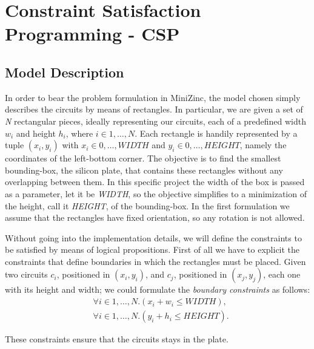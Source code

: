 \section{Constraint Satisfaction Programming - CSP}

\subsection{Model Description}

In order to bear the problem formulation in MiniZinc, the model chosen simply describes the circuits by means of rectangles. In particular, we are given a set of \emph{N} rectangular pieces, ideally representing our circuits, each of a predefined width $w_i$ and height $h_i$, where $i \in 1, \dots, N$. Each rectangle is handily represented by a tuple $(x_i, y_i)$ with $x_i \in 0,\dots, \textit{WIDTH}$ and $y_i \in 0,\dots, \textit{HEIGHT}$, namely the coordinates of the left-bottom corner. The objective is to find the smallest bounding-box, the silicon plate, that contains these rectangles without any overlapping between them. In this specific project the width of the box is passed as a parameter, let it be \textit{WIDTH}, so the objective simplifies to a minimization of the height, call it \textit{HEIGHT}, of the bounding-box. In the first formulation we assume that the rectangles have fixed orientation, so any rotation is not allowed. 

\bigskip
Without going into the implementation details, we will define the constraints to be satisfied by means of logical propositions. First of all we have to explicit the constraints that define boundaries in which the rectangles must be placed. Given two circuits $c_i$, positioned in $(x_i, y_i)$, and $c_j$, positioned in $(x_j, y_j)$, each one with its height and width; we could formulate the \textit{boundary constraints} as follows:
\begin{align}
    &\forall{i \in  1, \dots, N}.( x_i + w_i \leq \textit{WIDTH}),\\
    &\forall{i \in  1, \dots, N}.( y_i + h_i \leq \textit{HEIGHT}).
\end{align}

These constraints ensure that the circuits stays in the plate.

\clearpage